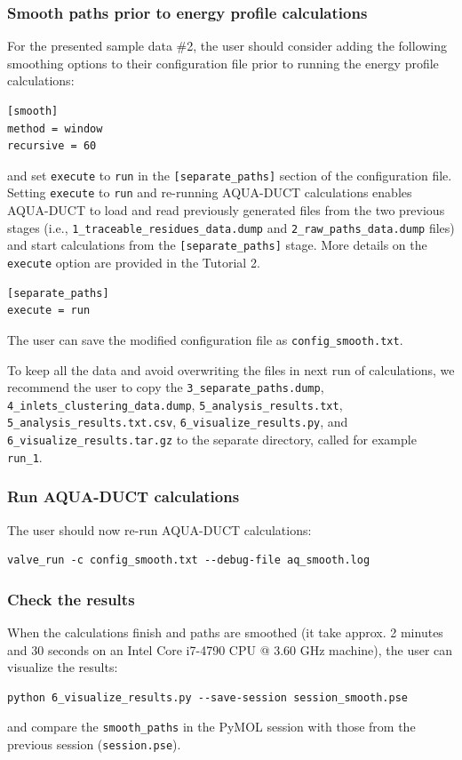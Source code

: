 \documentclass[9pt,tutorial]{livecoms}
\begin{document}
\subsubsection{Smooth paths prior to energy profile calculations}
For the presented sample data \#2, the user should consider adding the following smoothing options to their configuration file prior to running the energy profile calculations:
\begin{lstlisting}
[smooth]
method = window
recursive = 60
\end{lstlisting}
and set \texttt{execute} to \texttt{run} in the \texttt{[separate\_paths]} section of the configuration file. Setting \texttt{execute} to \texttt{run} and re-running AQUA-DUCT calculations enables AQUA-DUCT to load and read previously generated files from the two previous stages (i.e., \texttt{1\_traceable\_residues\_data.dump} and \texttt{2\_raw\_paths\_data.dump} files) and start calculations from the \texttt{[separate\_paths]} stage. More details on the \texttt{execute} option are provided in the Tutorial 2. 
\begin{lstlisting}
[separate_paths]
execute = run
\end{lstlisting}
The user can save the modified configuration file as \texttt{config\_smooth.txt}.

To keep all the data and avoid overwriting the files in next run of calculations, we recommend the user to copy the \texttt{3\_separate\_paths.dump}, \texttt{4\_inlets\_clustering\_data.dump}, \texttt{5\_analysis\_results.txt}, \texttt{5\_analysis\_results.txt.csv}, \texttt{6\_visualize\_results.py}, and \texttt{6\_visualize\_results.tar.gz} to the separate directory, called for example \texttt{run\_1}.

\subsubsection{Run AQUA-DUCT calculations}
The user should now re-run AQUA-DUCT calculations:
\begin{lstlisting}
valve_run -c config_smooth.txt --debug-file aq_smooth.log
\end{lstlisting}

\subsubsection{Check the results}
When the calculations finish and paths are smoothed (it take approx. 2 minutes and 30 seconds on an Intel Core i7-4790 CPU @ 3.60 GHz machine), the user can visualize the results:
\begin{lstlisting}
python 6_visualize_results.py --save-session session_smooth.pse
\end{lstlisting}
and compare the \texttt{smooth\_paths} in the PyMOL session with those from the previous session (\texttt{session.pse}). 
\end{document}
